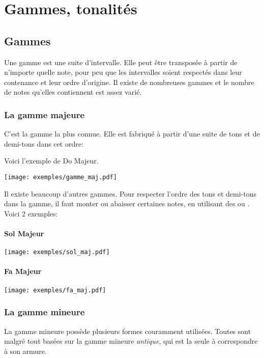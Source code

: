 \documentclass[11pt,a4paper]{scrreprt}
\begin{document}
\chapter{Gammes, tonalités}
\section{Gammes}
Une gamme est une suite d'intervalle. Elle peut être transposée à partir de n'importe quelle note, pour peu que les intervalles soient respectés dans leur contenance et leur ordre d'origine. Il existe de nombreuses gammes et le nombre de notes qu'elles contiennent est assez varié.

\subsection{La gamme majeure}
C'est la gamme la plus connue. Elle est fabriqué à partir d'une suite de tons et de demi-tons dans cet ordre:
\begin{center}
\end{center}
Voici l'exemple de Do Majeur.
\begin{center}
\texttt{[image: exemples/gamme\_maj.pdf]}
\end{center}

Il existe beaucoup d'autres gammes. Pour respecter l'ordre des tons et demi-tons dans la gamme, il faut monter ou abaisser certaines notes, en utilisant des \fetasharp{} ou \fetaflat. Voici 2 exemples:

\subsubsection{Sol Majeur}
\begin{center}
\texttt{[image: exemples/sol\_maj.pdf]}
\end{center}

\subsubsection{Fa Majeur}

\begin{center}
\texttt{[image: exemples/fa\_maj.pdf]}
\end{center}

\subsection{La gamme mineure}
La gamme mineure possède plusieurs formes couramment utilisées. Toutes sont malgré tout basées sur la gamme mineure \emph{antique}, qui est la seule à correspondre à son armure.
\end{document}
